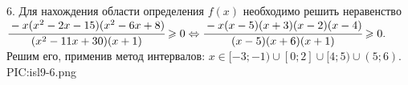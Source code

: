 6. Для нахождения области определения $f(x)$ необходимо решить неравенство\\ $\cfrac{-x(x^2-2x-15)(x^2-6x+8)}{(x^2-11x+30)(x+1)}\geqslant0
\Leftrightarrow \cfrac{-x(x-5)(x+3)(x-2)(x-4)}{(x-5)(x+6)(x+1)}\geqslant0.$ Решим его, применив метод интервалов:
$x\in[-3;-1)\cup[0;2]\cup[4;5)\cup(5;6).$
{{PIC:isl9-6.png}}\\
